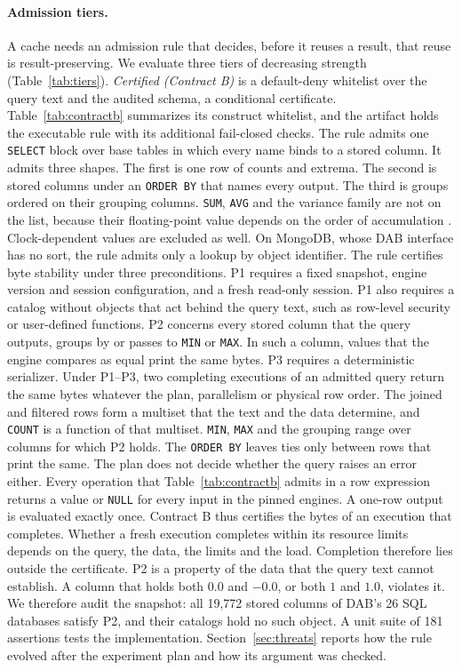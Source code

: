 \paragraph{Admission tiers.}
A cache needs an admission rule that decides, before it reuses a result, that reuse is result-preserving. We evaluate
three tiers of decreasing strength (Table~\ref{tab:tiers}). \emph{Certified (Contract B)} is a default-deny whitelist
over the query text and the audited schema, a conditional certificate. Table~\ref{tab:contractb} summarizes its
construct whitelist, and the artifact holds the executable rule with its additional fail-closed checks. The rule
admits one \texttt{SELECT} block over base tables in which every name binds to a stored column. It admits three shapes. The first is one row of counts and extrema. The second is stored columns under an \texttt{ORDER BY} that names every output. The third is groups ordered on their grouping columns. \texttt{SUM}, \texttt{AVG} and the variance family are not on the list, because
their floating-point value depends on the order of accumulation
\cite{mueller2018reproducible,duckdb2026nondeterminism}. Clock-dependent values are excluded as well. On MongoDB,
whose DAB interface has no sort, the rule admits only a lookup by object identifier. The rule certifies byte
stability under three preconditions. P1 requires a fixed snapshot, engine version and session configuration, and a
fresh read-only session. P1 also requires a catalog without objects that act behind the query text, such as
row-level security or user-defined functions. P2 concerns every stored column that the query outputs, groups by or
passes to \texttt{MIN} or \texttt{MAX}. In such a column, values that the engine compares as equal print the same
bytes. P3 requires a deterministic serializer. Under P1--P3, two completing executions of an admitted query return
the same bytes whatever the plan, parallelism or physical row order. The joined and filtered rows form a multiset
that the text and the data determine, and \texttt{COUNT} is a function of that multiset. \texttt{MIN}, \texttt{MAX}
and the grouping range over columns for which P2 holds. The \texttt{ORDER BY} leaves ties only between rows that
print the same. The plan does not decide whether the query raises an error either. Every operation that
Table~\ref{tab:contractb} admits in a row expression returns a value or \texttt{NULL} for every input in the pinned
engines. A one-row output is evaluated exactly once. Contract B thus certifies the bytes of an execution that
completes. Whether a fresh execution completes within its resource limits depends on the query, the data, the limits
and the load. Completion therefore lies outside the certificate. P2 is a property of the data that the query text
cannot establish. A column that holds both $0.0$ and $-0.0$, or both $1$ and $1.0$, violates it. We therefore audit
the snapshot: all 19,772 stored columns of DAB's 26 SQL databases satisfy P2, and their catalogs hold no such object.
A unit suite of 181 assertions tests the implementation. Section~\ref{sec:threats} reports how the rule evolved after
the experiment plan and how its argument was checked.

